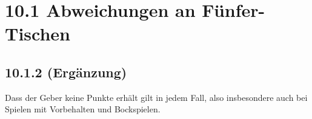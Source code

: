 \section*{10.1 Abweichungen an Fünfer-Tischen}

\subsection*{10.1.2 (Ergänzung)}

Dass der Geber keine Punkte erhält gilt in jedem Fall, also insbesondere auch
bei Spielen mit Vorbehalten und Bockspielen.








